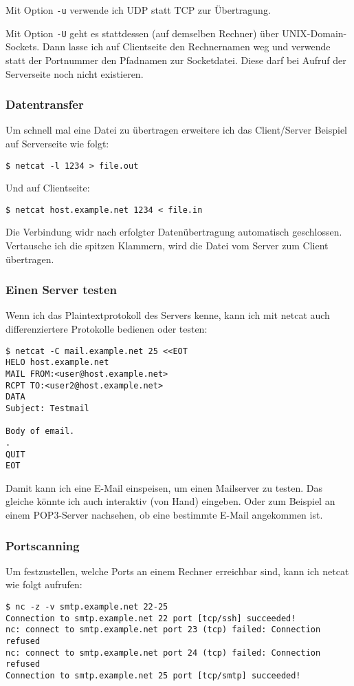 \begin{normaltext}
  Mit Option \verb?-u? verwende ich UDP statt TCP zur Übertragung.

  Mit Option \verb?-U? geht es stattdessen (auf demselben Rechner) über
  UNIX-Domain-Sockets. Dann lasse ich auf Clientseite den Rechnernamen weg und
  verwende statt der Portnummer den Pfadnamen zur Socketdatei. Diese darf bei
  Aufruf der Serverseite noch nicht existieren.

  \subsubsection*{Datentransfer}
  Um schnell mal eine Datei zu übertragen erweitere ich das Client/Server
  Beispiel auf Serverseite wie folgt:
  \begin{verbatim}
$ netcat -l 1234 > file.out
  \end{verbatim}
  Und auf Clientseite:
  \begin{verbatim}
$ netcat host.example.net 1234 < file.in
  \end{verbatim}
  Die Verbindung widr nach erfolgter Datenübertragung automatisch geschlossen.
  Vertausche ich die spitzen Klammern, wird die Datei vom Server zum Client
  übertragen.

  \subsubsection*{Einen Server testen}
  Wenn ich das Plaintextprotokoll des Servers kenne, kann ich mit netcat auch
  differenziertere Protokolle bedienen oder testen:
  \begin{verbatim}
$ netcat -C mail.example.net 25 <<EOT
HELO host.example.net
MAIL FROM:<user@host.example.net>
RCPT TO:<user2@host.example.net>
DATA
Subject: Testmail

Body of email.
.
QUIT
EOT
  \end{verbatim}
  Damit kann ich eine E-Mail einspeisen, um einen Mailserver zu testen. Das
  gleiche könnte ich auch interaktiv (von Hand) eingeben. Oder zum Beispiel an
  einem POP3-Server nachsehen, ob eine bestimmte E-Mail angekommen ist.

  \subsubsection*{Portscanning}
  Um festzustellen, welche Ports an einem Rechner erreichbar sind, kann ich
  netcat wie folgt aufrufen:
  \begin{verbatim}
$ nc -z -v smtp.example.net 22-25
Connection to smtp.example.net 22 port [tcp/ssh] succeeded!
nc: connect to smtp.example.net port 23 (tcp) failed: Connection refused
nc: connect to smtp.example.net port 24 (tcp) failed: Connection refused
Connection to smtp.example.net 25 port [tcp/smtp] succeeded!
  \end{verbatim}
\end{normaltext}

